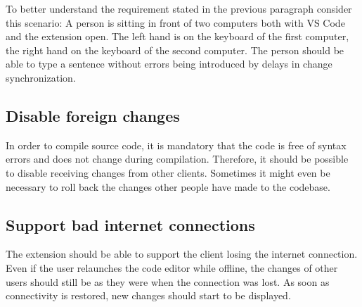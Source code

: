 To better understand the requirement stated in the previous paragraph consider this scenario:
A person is sitting in front of two computers both with VS Code and the extension open. The left hand is on the keyboard of the first computer, the right hand on the keyboard of the second computer. The person should be able to type a sentence without errors being introduced by delays in change synchronization.

\subsection{Disable foreign changes}

In order to compile source code, it is mandatory that the code is free of syntax errors and does not change during compilation. Therefore, it should be possible to disable receiving changes from other clients. Sometimes it might even be necessary to roll back the changes other people have made to the codebase.

\subsection{Support bad internet connections}

The extension should be able to support the client losing the internet connection. Even if the user relaunches the code editor while offline, the changes of other users should still be as they were when the connection was lost. As soon as connectivity is restored, new changes should start to be displayed. 